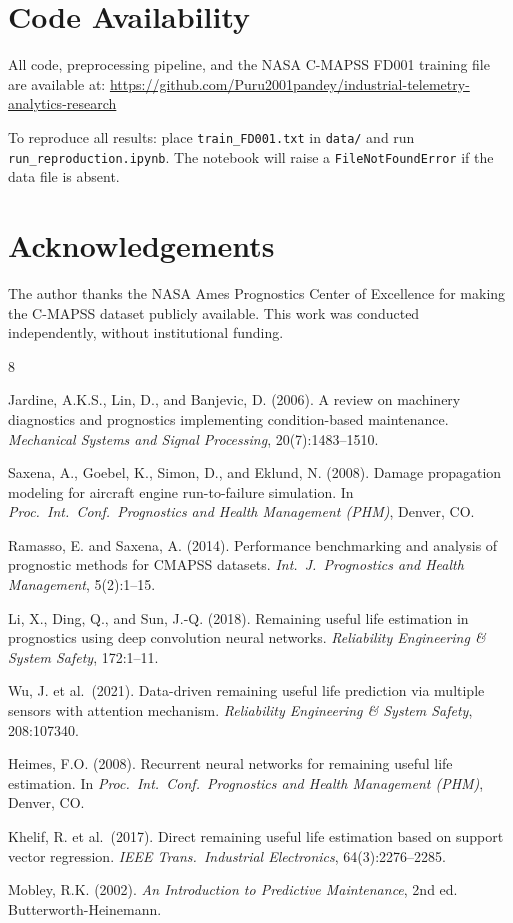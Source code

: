 \documentclass[10pt,twocolumn]{article}
\begin{document}
\section*{Code Availability}
All code, preprocessing pipeline, and the NASA C-MAPSS FD001 training file are
available at:
\url{https://github.com/Puru2001pandey/industrial-telemetry-analytics-research}

To reproduce all results: place \texttt{train\_FD001.txt} in \texttt{data/} and run
\texttt{run\_reproduction.ipynb}.
The notebook will raise a \texttt{FileNotFoundError} if the data file is absent.


\section*{Acknowledgements}
The author thanks the NASA Ames Prognostics Center of Excellence for making the
C-MAPSS dataset publicly available.
This work was conducted independently, without institutional funding.


\begin{thebibliography}{8}

Jardine, A.K.S., Lin, D., and Banjevic, D. (2006).
A review on machinery diagnostics and prognostics implementing condition-based maintenance.
\textit{Mechanical Systems and Signal Processing}, 20(7):1483--1510.

Saxena, A., Goebel, K., Simon, D., and Eklund, N. (2008).
Damage propagation modeling for aircraft engine run-to-failure simulation.
In \textit{Proc.\ Int.\ Conf.\ Prognostics and Health Management (PHM)}, Denver, CO.

Ramasso, E. and Saxena, A. (2014).
Performance benchmarking and analysis of prognostic methods for CMAPSS datasets.
\textit{Int.\ J.\ Prognostics and Health Management}, 5(2):1--15.

Li, X., Ding, Q., and Sun, J.-Q. (2018).
Remaining useful life estimation in prognostics using deep convolution neural networks.
\textit{Reliability Engineering \& System Safety}, 172:1--11.

Wu, J. et al.\ (2021).
Data-driven remaining useful life prediction via multiple sensors with attention mechanism.
\textit{Reliability Engineering \& System Safety}, 208:107340.

Heimes, F.O. (2008).
Recurrent neural networks for remaining useful life estimation.
In \textit{Proc.\ Int.\ Conf.\ Prognostics and Health Management (PHM)}, Denver, CO.

Khelif, R. et al.\ (2017).
Direct remaining useful life estimation based on support vector regression.
\textit{IEEE Trans.\ Industrial Electronics}, 64(3):2276--2285.

Mobley, R.K. (2002).
\textit{An Introduction to Predictive Maintenance}, 2nd ed.
Butterworth-Heinemann.

\end{thebibliography}
\end{document}
